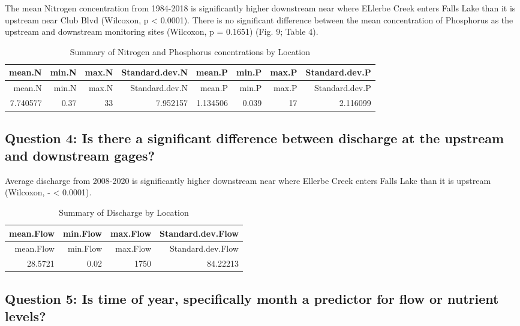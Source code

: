 \documentclass[12pt,]{article}
\begin{document}
The mean Nitrogen concentration from 1984-2018 is significantly higher
downstream near where ELlerbe Creek enters Falls Lake than it is
upstream near Club Blvd (Wilcoxon, p \textless{} 0.0001). There is no
significant difference between the mean concentration of Phosphorus as
the upstream and downstream monitoring sites (Wilcoxon, p = 0.1651)
(Fig. 9; Table 4).

\begin{longtable}[]{@{}rrrrrrrr@{}}
\caption{Summary of Nitrogen and Phosphorus conentrations by
Location}\tabularnewline
\toprule
mean.N & min.N & max.N & Standard.dev.N & mean.P & min.P & max.P &
Standard.dev.P\tabularnewline
\midrule
\endfirsthead
\toprule
mean.N & min.N & max.N & Standard.dev.N & mean.P & min.P & max.P &
Standard.dev.P\tabularnewline
\midrule
\endhead
7.740577 & 0.37 & 33 & 7.952157 & 1.134506 & 0.039 & 17 &
2.116099\tabularnewline
\bottomrule
\end{longtable}

\hypertarget{question-4-is-there-a-significant-difference-between-discharge-at-the-upstream-and-downstream-gages}{%
\subsection{Question 4: Is there a significant difference between
discharge at the upstream and downstream
gages?}\label{question-4-is-there-a-significant-difference-between-discharge-at-the-upstream-and-downstream-gages}}

Average discharge from 2008-2020 is significantly higher downstream near
where Ellerbe Creek enters Falls Lake than it is upstream (Wilcoxon, -
\textless{} 0.0001).

\begin{longtable}[]{@{}rrrr@{}}
\caption{Summary of Discharge by Location}\tabularnewline
\toprule
mean.Flow & min.Flow & max.Flow & Standard.dev.Flow\tabularnewline
\midrule
\endfirsthead
\toprule
mean.Flow & min.Flow & max.Flow & Standard.dev.Flow\tabularnewline
\midrule
\endhead
28.5721 & 0.02 & 1750 & 84.22213\tabularnewline
\bottomrule
\end{longtable}

\hypertarget{question-5-is-time-of-year-specifically-month-a-predictor-for-flow-or-nutrient-levels}{%
\subsection{Question 5: Is time of year, specifically month a predictor
for flow or nutrient
levels?}\label{question-5-is-time-of-year-specifically-month-a-predictor-for-flow-or-nutrient-levels}}
\end{document}
